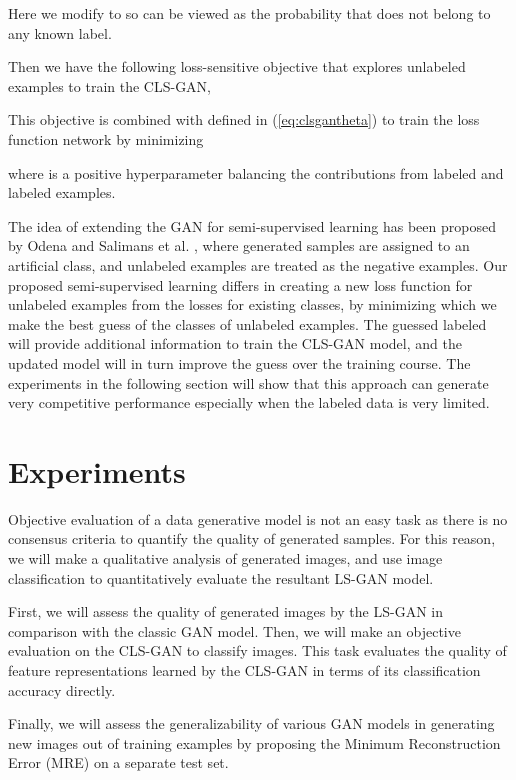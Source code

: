 \documentclass[11pt,fullpage, letterpaper,twoside]{article}
\newcommand{\1}[1]{\mathds{1}_{\left[#1\right]}}
\begin{document}
Here we modify  to  so  can be viewed as the probability that  does not belong to any known label.

Then we have the following loss-sensitive objective that explores unlabeled examples to train the CLS-GAN,


This objective is combined with  defined in (\ref{eq:clsgantheta}) to train the loss function network by minimizing

where  is a positive hyperparameter balancing the contributions from labeled and labeled examples.

The idea of extending the GAN for semi-supervised learning has been proposed by Odena \cite{odena2016semi} and
Salimans et al. \cite{salimans2016improved}, where generated samples are assigned to an artificial class, and unlabeled examples are treated as the negative examples.
Our proposed semi-supervised learning differs in creating a new loss function for unlabeled examples from the losses for existing classes, by minimizing which we make the best guess of the classes of unlabeled examples. The guessed labeled will provide additional information to train the CLS-GAN model, and the updated model will in turn improve the guess over the training course.
The experiments in the following section will show that this approach can generate very competitive performance especially when the labeled data is very limited.

\section{Experiments}\label{sec:exp}

Objective evaluation of a data generative model is not an easy task as there is no consensus criteria to quantify the quality of generated samples.  For this reason, we will make a qualitative analysis of generated images, and use image classification to quantitatively evaluate the resultant LS-GAN model.

First, we will assess the quality of generated images by the LS-GAN in comparison with the classic GAN model. Then, we will make an objective evaluation on the CLS-GAN to classify images. This task evaluates the quality of feature representations learned by the CLS-GAN in terms of its classification accuracy directly. 

Finally, we will assess the generalizability of various GAN models in generating new images out of training examples by proposing the Minimum Reconstruction Error (MRE) on a separate test set.
\end{document}
